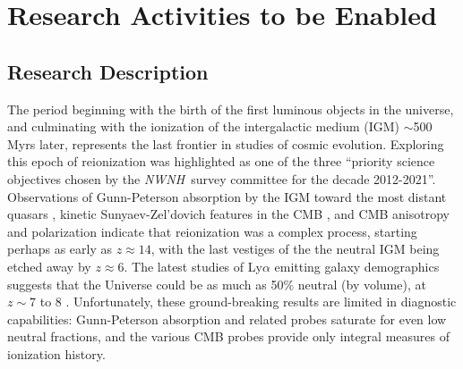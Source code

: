 \documentclass[preprint]{aastex}
\def\nwnh{{\sl NWNH}}
\begin{document}
\vspace{-0.25in}
\section{Research Activities to be Enabled}
\vspace{-6pt}

\subsection{Research Description}
\vspace{-6pt}



The period beginning with the birth of the first luminous objects in
the universe, and culminating with the ionization of the intergalactic
medium (IGM) $\sim$500 Myrs later, represents the last frontier in
studies of cosmic evolution.  Exploring this epoch of reionization was
highlighted as one of the three ``priority science objectives chosen
by the \nwnh\ survey committee for the decade 2012-2021''. Observations
of Gunn-Peterson absorption by the IGM toward the most distant quasars
\citep{fan_et_al2006}, kinetic Sunyaev-Zel'dovich features in the CMB
\citep{zahn_et_al2012}, and CMB anisotropy and polarization
\citep{page_et_al2007,planck_et_al2013} indicate that reionization was
a complex process, starting perhaps as early as $z\approx14$, with the
last vestiges of the the neutral IGM being etched away by $z\approx6$.
The latest studies of Ly$\alpha$ emitting galaxy demographics suggests
that the Universe could be as much as 50\% neutral (by volume), at $z
\sim 7$ to 8 \citep{robertson_2013}.  Unfortunately, these
ground-breaking results are limited in diagnostic capabilities:
Gunn-Peterson absorption and related probes saturate for even low neutral
fractions, and the various CMB probes provide only integral measures
of ionization history.
\end{document}

